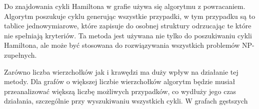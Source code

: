\documentclass[polish,polish,a4paper]{article}
\begin{document}
\begin{spacing}{1.25}
Do znajdowania cykli Hamiltona w grafie używa się algorytmu z powracaniem. Algorytm poszukuje cyklu generując wszystkie przypadki, w tym przypadku są to tablice jednowymiarowe, które zapisuje do osobnej struktury odrzucając te które nie spełniają kryteriów. Ta metoda jest używana nie tylko do poszukiwaniu cykli Hamiltona, ale może być stosowana do rozwiązywania wszystkich problemów NP-zupełnych.

Zarówno liczba wierzchołków jak i krawędzi ma duży wpływ na działanie tej metody.
Dla grafów o większej liczbie wierzchołków algorytm będzie musiał przeanalizować większą liczbę możliwych przypadków, co wydłuży jego czas działania, szczególnie przy wyszukiwaniu wszystkich cykli. W grafach gęstszych 
\end{spacing}
	\newpage
	\tableofcontents
\end{document}
